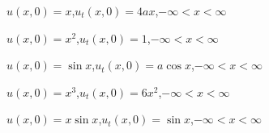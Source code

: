 \begin{exerciselist}
  \item\label{exer:12.2.64} $u(x,0)=x$,\quad $u_{t}(x,0)=4ax$,\quad $-\infty<x<\infty$

  \item\label{exer:12.2.65} $u(x,0)=x^{2}$,\quad $u_{t}(x,0)=1$,\quad $-\infty<x<\infty$

  \item\label{exer:12.2.66} $u(x,0)=\sin x$,\quad $u_{t}(x,0)=a\cos x$,\quad $-\infty<x<\infty$

  \item\label{exer:12.2.67} $u(x,0)=x^{3}$,\quad $u_{t}(x,0)=6x^{2}$,\quad $-\infty<x<\infty$

  \item\label{exer:12.2.68} $u(x,0)=x\sin x$,\quad $u_{t}(x,0)=\sin x$,\quad $-\infty<x<\infty$
\end{exerciselist}
